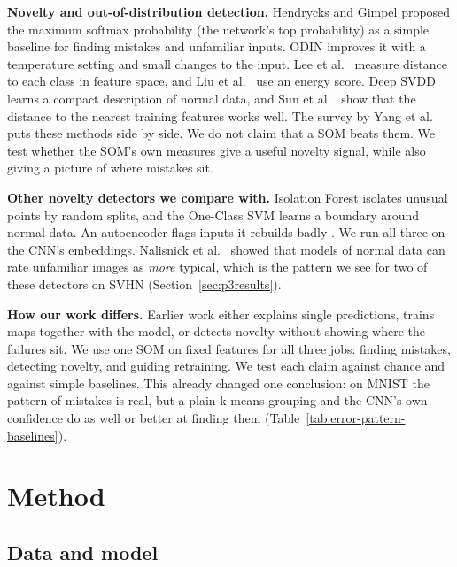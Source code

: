 \documentclass[11pt]{article}
\begin{document}
\textbf{Novelty and out-of-distribution detection.} Hendrycks and Gimpel \parencite{hendrycks2017baseline} proposed the maximum softmax probability (the network's top probability) as a simple baseline for finding mistakes and unfamiliar inputs.
ODIN \parencite{liang2018odin} improves it with a temperature setting and small changes to the input. Lee et al.\ \parencite{lee2018mahalanobis} measure distance to each class in feature space, and Liu et al.\ \parencite{liu2020energy} use an energy score.
Deep SVDD \parencite{ruff2018deep} learns a compact description of normal data, and Sun et al.\ \parencite{sun2022knn} show that the distance to the nearest training features works well. The survey by Yang et al.\ \parencite{yang2024generalized} puts these methods side by side.
We do not claim that a SOM beats them. We test whether the SOM's own measures give a useful novelty signal, while also giving a picture of where mistakes sit.

\textbf{Other novelty detectors we compare with.} Isolation Forest \parencite{liu2008isolation} isolates unusual points by random splits, and the One-Class SVM \parencite{scholkopf2001support} learns a boundary around normal data. An autoencoder flags inputs it rebuilds badly \parencite{sakurada2014autoencoder}.
We run all three on the CNN's embeddings. Nalisnick et al.\ \parencite{nalisnick2019deep} showed that models of normal data can rate unfamiliar images as \emph{more} typical, which is the pattern we see for two of these detectors on SVHN (Section~\ref{sec:p3results}).

\textbf{How our work differs.} Earlier work either explains single predictions, trains maps together with the model, or detects novelty without showing where the failures sit. We use one SOM on fixed features for all three jobs: finding mistakes, detecting novelty, and guiding retraining.
We test each claim against chance and against simple baselines. This already changed one conclusion: on MNIST the pattern of mistakes is real, but a plain k-means grouping and the CNN's own confidence do as well or better at finding them (Table~\ref{tab:error-pattern-baselines}).

\section{Method}
\label{sec:method}

\subsection{Data and model}
\end{document}
